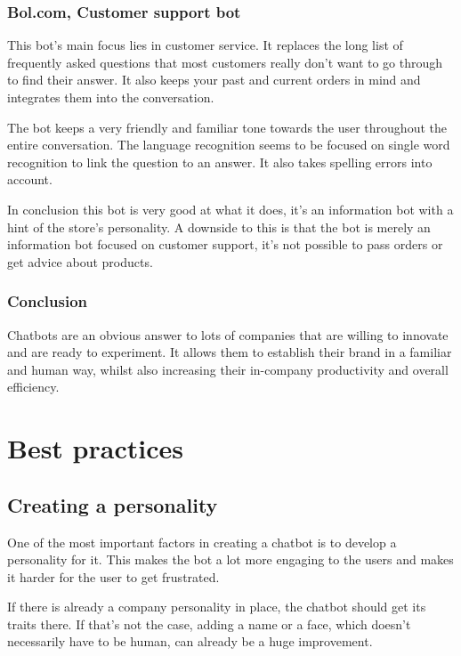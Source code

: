 \subsection{Bol.com, Customer support bot}

This bot's main focus lies in customer service. It replaces the long list of frequently asked questions that most customers really don't want to go through to find their answer. It also keeps your past and current orders in mind and integrates them into the conversation.

The bot keeps a very friendly and familiar tone towards the user throughout the entire conversation. The language recognition seems to be focused on single word recognition to link the question to an answer. It also takes spelling errors into account.

In conclusion this bot is very good at what it does, it's an information bot with a hint of the store's personality. A downside to this is that the bot is merely an information bot focused on customer support, it's not possible to pass orders or get advice about products.

\subsection{Conclusion}

Chatbots are an obvious answer to lots of companies that are willing to innovate and are ready to experiment. It allows them to establish their brand in a familiar and human way, whilst also increasing their in-company productivity and overall efficiency.

\chapter{Best practices}

\section{Creating a personality}

One of the most important factors in creating a chatbot is to develop a personality for it. This makes the bot a lot more engaging to the users and makes it harder for the user to get frustrated.

If there is already a company personality in place, the chatbot should get its traits there. If that's not the case, adding a name or a face, which doesn't necessarily have to be human, can already be a huge improvement.

